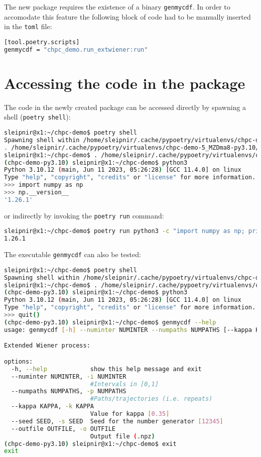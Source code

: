 \documentclass[10pt]{article}
\begin{document}
The new package requires the existence of a binary \texttt{genmycdf}. In order to accomodate this feature the following block of 
code had to be manually inserted in the \texttt{toml} file:
\begin{lstlisting}[language=bash]
[tool.poetry.scripts]
genmycdf = "chpc_demo.run_extwiener:run"
\end{lstlisting}


\section{Accessing the code in the package}
The code in the newly created package can be accessed directly by spawning a shell (\lstinline[language=bash]{poetry shell}):
\begin{lstlisting}[language=bash]
sleipnir@x1:~/chpc-demo$ poetry shell 
Spawning shell within /home/sleipnir/.cache/pypoetry/virtualenvs/chpc-demo-5_MZDma8-py3.10
. /home/sleipnir/.cache/pypoetry/virtualenvs/chpc-demo-5_MZDma8-py3.10/bin/activate
sleipnir@x1:~/chpc-demo$ . /home/sleipnir/.cache/pypoetry/virtualenvs/chpc-demo-5_MZDma8-py3.10/bin/activate
(chpc-demo-py3.10) sleipnir@x1:~/chpc-demo$ python3
Python 3.10.12 (main, Jun 11 2023, 05:26:28) [GCC 11.4.0] on linux
Type "help", "copyright", "credits" or "license" for more information.
>>> import numpy as np
>>> np.__version__
'1.26.1'
\end{lstlisting}
or indirectly by invoking 
the \texttt{poetry run} command:
\begin{lstlisting}[language=bash]
sleipnir@x1:~/chpc-demo$ poetry run python3 -c "import numpy as np; print(np.__version__)"
1.26.1
\end{lstlisting}

The executable \texttt{genmycdf} can also be tested:
\begin{lstlisting}[language=bash]
sleipnir@x1:~/chpc-demo$ poetry shell
Spawning shell within /home/sleipnir/.cache/pypoetry/virtualenvs/chpc-demo-5_MZDma8-py3.10
sleipnir@x1:~/chpc-demo$ . /home/sleipnir/.cache/pypoetry/virtualenvs/chpc-demo-5_MZDma8-py3.10/bin/activate
(chpc-demo-py3.10) sleipnir@x1:~/chpc-demo$ python3
Python 3.10.12 (main, Jun 11 2023, 05:26:28) [GCC 11.4.0] on linux
Type "help", "copyright", "credits" or "license" for more information.
>>> quit()
(chpc-demo-py3.10) sleipnir@x1:~/chpc-demo$ genmycdf --help
usage: genmycdf [-h] --numinter NUMINTER --numpaths NUMPATHS [--kappa KAPPA] [--seed SEED] --outfile OUTFILE

Extended Wiener process:

options:
  -h, --help            show this help message and exit
  --numinter NUMINTER, -i NUMINTER
                        #Intervals in [0,1]
  --numpaths NUMPATHS, -p NUMPATHS
                        #Paths/trajectories (i.e. repeats)
  --kappa KAPPA, -k KAPPA
                        Value for kappa [0.35]
  --seed SEED, -s SEED  Seed for the number generator [12345]
  --outfile OUTFILE, -o OUTFILE
                        Output file (.npz)
(chpc-demo-py3.10) sleipnir@x1:~/chpc-demo$ exit
exit
\end{lstlisting}
\end{document}
